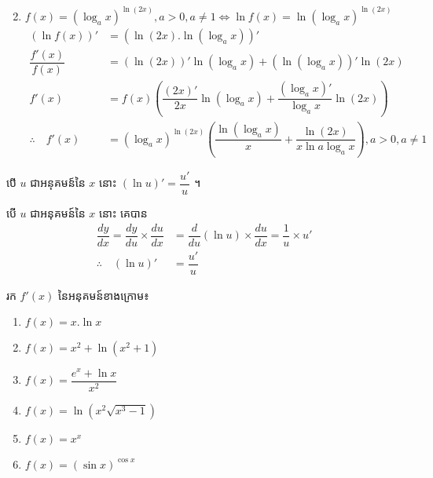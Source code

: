 \documentclass[a4paper,12pt]{article}
\begin{document}
\begin{enumerate}
\begin{align*}
	      \end{align*}
	\item $f(x)=(\log _a x)^{\ln (2x)},a>0,a\neq 1\Longleftrightarrow \ln f(x)=\ln (\log_a x)^{\ln (2x)}$
	      \begin{align*}
		      \left(\ln f(x) \right)' & =\left(\ln (2x).\ln (\log_a x) \right)'                                                                       \\
		      \dfrac{f'(x)}{f(x)}     & =(\ln (2x))'\ln (\log_a x)+(\ln (\log _a x))' \ln (2x)                                                        \\
		      f'(x)                   & =f(x)\left(\dfrac{(2x)'}{2x}\ln (\log_a x)+\dfrac{(\log _a x)'}{\log_a x}\ln (2x) \right)                     \\
		      \therefore \quad f'(x)  & =(\log _a x)^{\ln (2x)}\left(\dfrac{\ln (\log_a x)}{x}+\dfrac{\ln (2x)}{x\ln a \log_a x} \right) ,a>0,a\neq 1
	      \end{align*}
\end{enumerate}


\begin{general}
	បើ $u$ ជាអនុគមន៍នៃ $x$ នោះ $(\ln u)'=\dfrac{u'}{u}$ ។
\end{general}
\solution
បើ $u$ ជាអនុគមន៍នៃ $x$ នោះ  គេបាន
\begin{align*}
	\dfrac{dy}{dx}=\dfrac{dy}{du}\times \dfrac{du}{dx} & =\dfrac{d}{du}(\ln u)\times \dfrac{du}{dx}=\dfrac{1}{u}\times u' \\
	\therefore \quad (\ln u)'                          & =\dfrac{u'}{u}
\end{align*}
\begin{example}
	រក $f'(x)$ នៃអនុគមន៍ខាងក្រោម៖
	\begin{multicols}{2}
		\begin{enumerate}
			\item $f(x)=x.\ln x$
			\item $f(x)=x^2+\ln (x^2+1)$
			\item $f(x)=\dfrac{e^x+\ln x}{x^2}$
			\item $f(x)=\ln (x^2 \sqrt{x^3-1})$
			\item $f(x)=x^x$
			\item $f(x)=(\sin x)^{\cos x}$
		\end{enumerate}
	\end{multicols}
\end{example}
\end{document}
